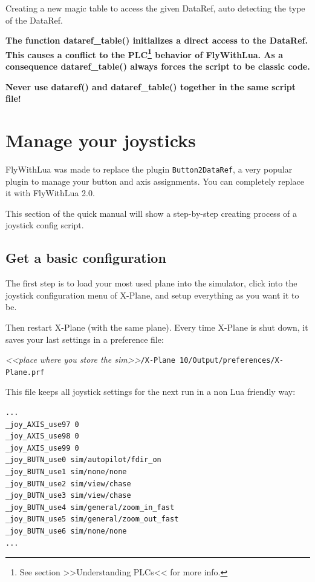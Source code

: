 \documentclass[11pt,parskip=half,a4paper]{scrartcl}
\begin{document}
Creating a new magic table to access the given DataRef, auto detecting the type of the DataRef.

\vspace{2ex}

\textbf{The function dataref\_table() initializes a direct access to the DataRef. This causes a conflict to the PLC\footnote{See section >>Understanding PLCs<< for more info.} behavior of FlyWithLua. As a consequence dataref\_table() always forces the script to be classic code.}

\textbf{Never use dataref() and dataref\_table() together in the same script file!}

\newpage
\section{Manage your joysticks}

FlyWithLua was made to replace the plugin \verb|Button2DataRef|, a very popular plugin to manage your button and axis assignments. You can completely replace it with FlyWithLua 2.0.

This section of the quick manual will show a step-by-step creating process of a joystick config script.

\subsection{Get a basic configuration}

The first step is to load your most used plane into the simulator, click into the joystick configuration menu of X-Plane, and setup everything as you want it to be.

Then restart X-Plane (with the same plane). Every time X-Plane is shut down, it saves your last settings in a preference file:

\emph{<<place where you store the sim>>}\verb|/X-Plane 10/Output/preferences/X-Plane.prf|

This file keeps all joystick settings for the next run in a non Lua friendly way:

\begin{lstlisting}[firstnumber=1680]
...
_joy_AXIS_use97 0
_joy_AXIS_use98 0
_joy_AXIS_use99 0
_joy_BUTN_use0 sim/autopilot/fdir_on
_joy_BUTN_use1 sim/none/none
_joy_BUTN_use2 sim/view/chase
_joy_BUTN_use3 sim/view/chase
_joy_BUTN_use4 sim/general/zoom_in_fast
_joy_BUTN_use5 sim/general/zoom_out_fast
_joy_BUTN_use6 sim/none/none
...
\end{lstlisting}
\end{document}
